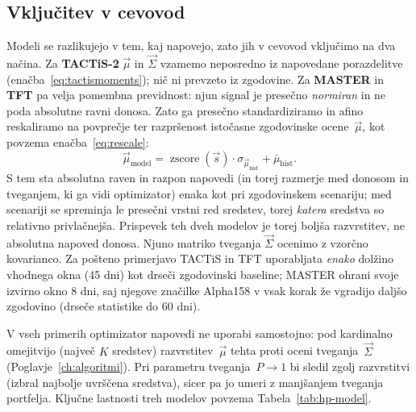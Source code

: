 \subsection{Vključitev v cevovod}
\label{sec:vkljucitev}
Modeli se razlikujejo v tem, kaj napovejo, zato jih v cevovod vključimo na dva načina. Za \textbf{TACTiS-2} $\vec{\mu}$ in $\vec{\Sigma}$ vzamemo neposredno iz napovedane porazdelitve (enačba~\eqref{eq:tactismoments}); nič ni prevzeto iz zgodovine. Za \textbf{MASTER} in \textbf{TFT} pa velja pomembna previdnost: njun signal je presečno \emph{normiran} in ne poda absolutne ravni donosa. Zato ga presečno standardiziramo in afino reskaliramo na povprečje ter razpršenost istočasne zgodovinske ocene~$\vec{\mu}$, kot povzema enačba~\eqref{eq:rescale}:
\begin{equation}
\label{eq:rescale}
  \vec{\mu}_{\text{model}} = \operatorname{zscore}(\vec{s})\cdot \sigma_{\vec{\mu}_{\text{hist}}} + \bar{\mu}_{\text{hist}}.
\end{equation}
S tem sta absolutna raven in razpon napovedi (in torej razmerje med donosom in tveganjem, ki ga vidi optimizator) enaka kot pri zgodovinskem scenariju; med scenariji se spreminja le presečni vrstni red sredstev, torej \emph{katera} sredstva so relativno privlačnejša. Prispevek teh dveh modelov je torej boljša razvrstitev, ne absolutna napoved donosa. Njuno matriko tveganja $\vec{\Sigma}$ ocenimo z vzorčno kovarianco. Za pošteno primerjavo TACTiS in TFT uporabljata \emph{enako} dolžino vhodnega okna (45 dni) kot drseči zgodovinski baseline; MASTER ohrani svoje izvirno okno 8 dni, saj njegove značilke Alpha158 v vsak korak že vgradijo daljšo zgodovino (drseče statistike do 60 dni).

V vseh primerih optimizator napovedi ne uporabi samostojno: pod kardinalno omejitvijo (največ $K$ sredstev) razvrstitev~$\vec{\mu}$ tehta proti oceni tveganja~$\vec{\Sigma}$ (Poglavje~\ref{ch:algoritmi}). Pri parametru tveganja~$P\!\to\!1$ bi sledil zgolj razvrstitvi (izbral najbolje uvrščena sredstva), sicer pa jo umeri z manjšanjem tveganja portfelja. Ključne lastnosti treh modelov povzema Tabela~\ref{tab:hp-model}.

